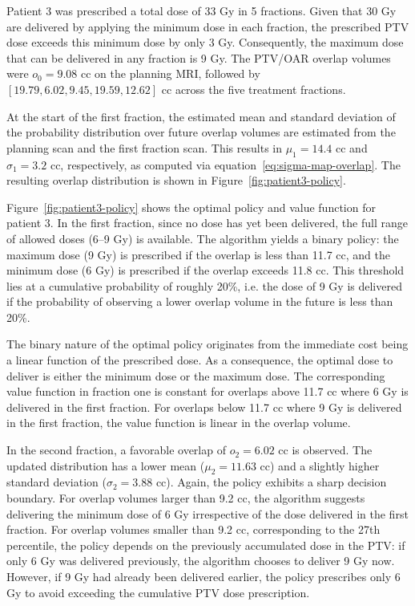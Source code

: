 \documentclass[11pt]{article}
\begin{document}
Patient 3 was prescribed a total dose of 33 Gy in 5 fractions. Given that 30 Gy are delivered by applying the minimum dose in each fraction, the prescribed PTV dose exceeds this minimum dose by only 3 Gy. Consequently, the maximum dose that can be delivered in any fraction is 9 Gy. The PTV/OAR overlap volumes were $o_0 = 9.08$ cc on the planning MRI, followed by $[19.79, 6.02, 9.45, 19.59, 12.62]$ cc across the five treatment fractions.

At the start of the first fraction, the estimated mean and standard deviation of the probability distribution over future overlap volumes are estimated from the planning scan and the first fraction scan. This results in $\mu_1 = 14.4$ cc and $\sigma_1 = 3.2$ cc, respectively, as computed via equation~\eqref{eq:sigma-map-overlap}. The resulting overlap distribution is shown in Figure~\ref{fig:patient3-policy}.

Figure~\ref{fig:patient3-policy} shows the optimal policy and value function for patient 3. In the first fraction, since no dose has yet been delivered, the full range of allowed doses (6--9 Gy) is available. The algorithm yields a binary policy: the maximum dose (9 Gy) is prescribed if the overlap is less than 11.7 cc, and the minimum dose (6 Gy) is prescribed if the overlap exceeds 11.8 cc. This threshold lies at a cumulative probability of roughly 20\%, i.e. the dose of 9 Gy is delivered if the probability of observing a lower overlap volume in the future is less than 20\%.

The binary nature of the optimal policy originates from the immediate cost being a linear function of the prescribed dose. As a consequence, the optimal dose to deliver is either the minimum dose or the maximum dose. The corresponding value function in fraction one is constant for overlaps above 11.7 cc where 6 Gy is delivered in the first fraction. For overlaps below 11.7 cc where 9 Gy is delivered in the first fraction, the value function is linear in the overlap volume.

In the second fraction, a favorable overlap of $o_2 = 6.02$ cc is observed. The updated distribution has a lower mean ($\mu_2 = 11.63$ cc) and a slightly higher standard deviation ($\sigma_2 = 3.88$ cc). Again, the policy exhibits a sharp decision boundary. For overlap volumes larger than 9.2 cc, the algorithm suggests delivering the minimum dose of 6 Gy irrespective of the dose delivered in the first fraction. For overlap volumes smaller than 9.2 cc, corresponding to the 27th percentile, the policy depends on the previously accumulated dose in the PTV: if only 6 Gy was delivered previously, the algorithm chooses to deliver 9 Gy now. However, if 9 Gy had already been delivered earlier, the policy prescribes only 6 Gy to avoid exceeding the cumulative PTV dose prescription.
\end{document}
